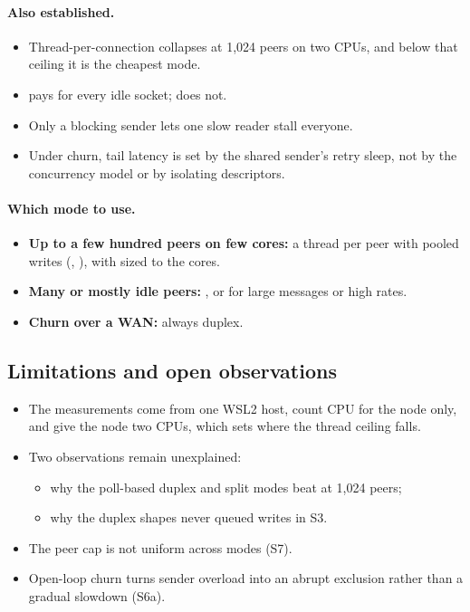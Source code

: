 \paragraph{Also established.}
\begin{itemize}
  \item Thread-per-connection collapses at 1,024 peers on two CPUs, and below that
        ceiling it is the cheapest mode.
  \item {} pays for every idle socket;  does not.
  \item Only a blocking sender lets one slow reader stall everyone.
  \item Under churn, tail latency is set by the shared sender's retry sleep, not by
        the concurrency model or by isolating descriptors.
\end{itemize}

\paragraph{Which mode to use.}
\begin{itemize}
  \item \textbf{Up to a few hundred peers on few cores:} a thread per peer with
        pooled writes (, ), with
         sized to the cores.
  \item \textbf{Many or mostly idle peers:} , or
         for large messages or high rates.
  \item \textbf{Churn over a WAN:} always duplex.
\end{itemize}

\subsection{Limitations and open observations}

\begin{itemize}
  \item The measurements come from one WSL2 host, count CPU for the node only, and
        give the node two CPUs, which sets where the thread ceiling falls.
  \item Two observations remain unexplained:
        \begin{itemize}
          \item why the poll-based duplex and split modes beat  at 1,024
                peers;
          \item why the duplex shapes never queued writes in S3.
        \end{itemize}
  \item The peer cap is not uniform across modes (S7).
  \item Open-loop churn turns sender overload into an abrupt exclusion rather than a
        gradual slowdown (S6a).
\end{itemize}

